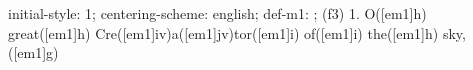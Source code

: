 initial-style: 1;
centering-scheme: english;
def-m1: \grealign;
(f3) 1. O([em1]h) great([em1]h) Cre([em1]iv)a([em1]jv)tor([em1]i) of([em1]i) the([em1]h) sky,([em1]g)